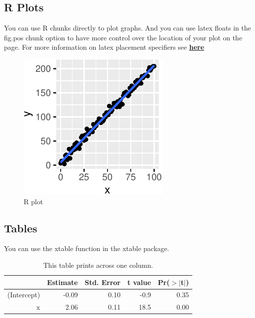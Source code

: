 \documentclass[10pt, letterpaper]{article}
\newenvironment{CodeChunk}{}{}
\begin{document}
\hypertarget{r-plots}{%
\subsection{R Plots}\label{r-plots}}

You can use R chunks directly to plot graphs. And you can use latex
floats in the fig.pos chunk option to have more control over the
location of your plot on the page. For more information on latex
placement specifiers see
\textbf{\href{https://en.wikibooks.org/wiki/LaTeX/Floats,_Figures_and_Captions}{here}}

\begin{CodeChunk}
\begin{figure}[H]

{\centering \includegraphics{figs/plot-1} 

}

\caption[R plot]{R plot}\label{fig:plot}
\end{figure}
\end{CodeChunk}

\hypertarget{tables}{%
\subsection{Tables}\label{tables}}

You can use the xtable function in the xtable package.

\begin{table}[H]
\centering
\begin{tabular}{rrrrr}
  \hline
 & Estimate & Std. Error & t value & Pr($>$$|$t$|$) \\ 
  \hline
(Intercept) & -0.09 & 0.10 & -0.9 & 0.35 \\ 
  x & 2.06 & 0.11 & 18.5 & 0.00 \\ 
   \hline
\end{tabular}
\caption{This table prints across one column.} 
\end{table}
\end{document}
